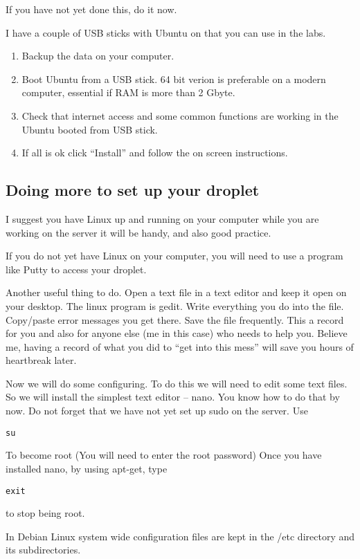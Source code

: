 \documentclass[12pt, a4paper]{article}
\begin{document}
If you have not yet done this, do it now. 

I have a couple of USB sticks with Ubuntu on that you can use in the labs.


\begin{enumerate}
 \item Backup the data on your computer.
 \item Boot Ubuntu from a USB stick. 64 bit verion is preferable on a modern computer, 
  essential if RAM is more than 2 Gbyte.
 \item Check that internet access and some common functions are working in the Ubuntu booted from USB stick.
 \item If all is ok click ``Install'' and follow the on screen instructions.
\end{enumerate}

\subsection*{Doing more to set up your droplet}


I suggest you have Linux up and running on your computer while you are working on the server  it will be handy, and also good practice.

If you do not yet have Linux on your computer, you will need to use a program like Putty to access your droplet.

Another useful thing to do. Open a text file in a text editor and keep it open on your desktop. The linux program is gedit. Write everything you do into the file. Copy/paste error messages you get there. Save the file frequently. This a record for you and also for anyone else (me in this case) who needs to help you. Believe me, having a record of what you did to “get into this mess” will save you hours of heartbreak later. 

Now we will do some configuring. To do this we will need to edit some text files. So we will install the simplest text editor – nano. You know how to do that by now. Do not forget that we have not yet set up sudo on the server.
Use
\begin{verbatim}
su
\end{verbatim}
To become root
(You will need to enter the root password)
Once you have installed nano, by uısing apt-get, type
\begin{verbatim}
exit
\end{verbatim}
to stop being root.

In Debian Linux system wide configuration files are kept in the /etc directory and its subdirectories.
\end{document}
